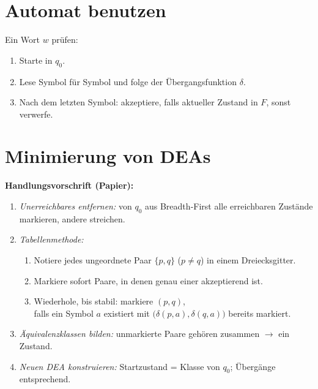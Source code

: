 \section{Automat benutzen}
Ein Wort $w$ prüfen:
\begin{enumerate}
  \item Starte in $q_0$.
  \item Lese Symbol für Symbol und folge der Übergangsfunktion $\delta$.
  \item Nach dem letzten Symbol: akzeptiere, falls aktueller Zustand in $F$, sonst verwerfe.
\end{enumerate}

\section{Minimierung von DEAs}\label{sec:min-dea}
\textbf{Handlungsvorschrift (Papier):}
\begin{enumerate}
  \item \textit{Unerreichbares entfernen:} von $q_0$ aus Breadth‑First alle erreichbaren Zustände markieren, andere streichen.
  \item \textit{Tabellenmethode:}
    \begin{enumerate}
      \item Notiere jedes ungeordnete Paar $\{p,q\}$ ($p\neq q$) in einem Dreiecksgitter.
      \item Markiere sofort Paare, in denen genau einer akzeptierend ist.
      \item Wiederhole, bis stabil: markiere $(p,q)$,\\ falls ein Symbol $a$ existiert mit $\bigl(\delta(p,a),\delta(q,a)\bigr)$ bereits markiert.
    \end{enumerate}
  \item \textit{Äquivalenzklassen bilden:} unmarkierte Paare gehören zusammen $\to$ ein Zustand.
  \item \textit{Neuen DEA konstruieren:} Startzustand = Klasse von $q_0$; Übergänge entsprechend.
\end{enumerate}

